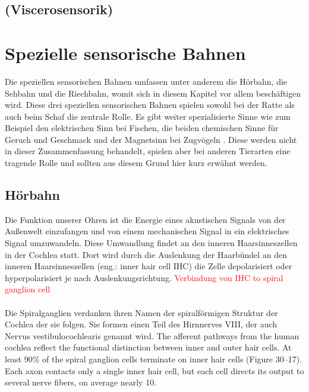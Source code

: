 \documentclass[12pt,a4paper,pdftex]{article}
\begin{document}
\subsection{(Viscerosensorik)}

\newpage
\section{Spezielle sensorische Bahnen}
\label{sec:spezsens}
Die speziellen sensorischen Bahnen umfassen unter anderem die Hörbahn, die Sehbahn und die Riechbahn, womit sich in diesem Kapitel vor allem beschäftigen wird. Diese drei speziellen sensorischen Bahnen spielen sowohl bei der Ratte als auch beim Schaf die zentrale Rolle. Es gibt weiter spezialisierte Sinne wie zum Beispiel den elektrischen Sinn bei Fischen, die beiden chemischen Sinne für Geruch und Geschmack und der Magnetsinn bei Zugvögeln \cite{smith2008biology}. Diese werden nicht in dieser Zusammenfassung behandelt, spielen aber bei anderen Tierarten eine tragende Rolle und sollten aus diesem Grund hier kurz erwähnt werden.

\subsection{Hörbahn}

Die Funktion unserer Ohren ist die Energie eines akustischen Signals von der Außenwelt einzufangen und von einem mechanischen Signal in ein elektrisches Signal umzuwandeln. Diese Umwandlung findet an den inneren Haarsinneszellen in der Cochlea statt. Dort wird durch die Auslenkung der Haarbündel an den inneren Haarsinneszellen (eng.: inner hair cell IHC) die Zelle depolarisiert oder hyperpolarisiert je nach Auslenkungsrichtung. 
\textcolor{red}{Verbindung von IHC to spiral ganglion cell}
\\
\\
Die Spiralganglien verdanken ihren Namen der spiralförmigen Struktur der Cochlea der sie folgen. Sie formen einen Teil des Hirnnerves VIII, der auch Nervus vestibulocochlearis genannt wird. The afferent pathways from the human cochlea
        reflect the functional distinction between inner and
        outer hair cells. At least 90\% of the spiral ganglion
        cells terminate on inner hair cells (Figure 30–17). Each
        axon contacts only a single inner hair cell, but each cell
        directs its output to several nerve fibers, on average
        nearly 10.
\end{document}
